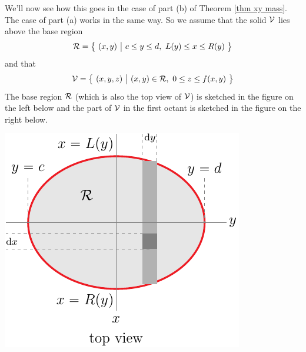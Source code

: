 We'll now see how this goes in the case of part (b)
of Theorem \ref{thm xy mass}. The case of part (a) works in the same way.
So we assume that the solid $\mathcal{V}$ lies above the base region
\begin{equation*}
\mathcal{R} = \big\{\ (x,y)\ \big|\ c\le y\le d,\ L(y)\le x\le R(y)\ \big\}
\end{equation*}
and that
\begin{equation*}
\mathcal{V} = \big\{\ (x,y,z)\ \big|\ (x,y)\in\mathcal{R},\  0\le z\le f(x,y)\ \big\}
\end{equation*}
The base region $\mathcal{R}$ (which is also the top view of $\mathcal{V}$)
is sketched in the figure on the left below and
the part of $\mathcal{V}$ in the first octant is sketched in the figure on the right below.
\begin{efig}
\begin{center}
   \includegraphics{volSliceB.pdf}\qquad
\end{center}
\end{efig}
